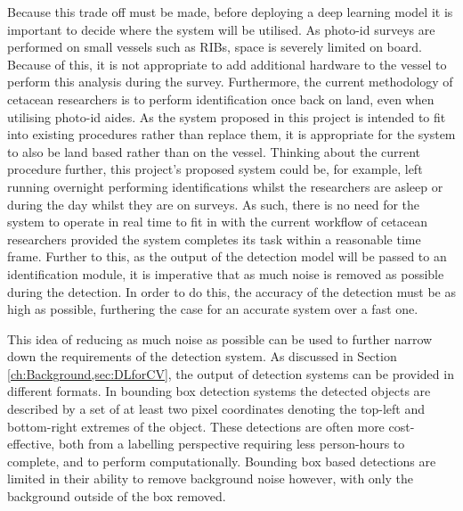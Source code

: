  Because this trade off must be made, before deploying a deep learning model it is important to decide where the system will be utilised. As photo-id surveys are performed on small vessels such as RIBs, space is severely limited on board. Because of this, it is not appropriate to add additional hardware to the vessel to perform this analysis during the survey. Furthermore, the current methodology of cetacean researchers is to perform identification once back on land, even when utilising photo-id aides. As the system proposed in this project is intended to fit into existing procedures rather than replace them, it is appropriate for the system to also be land based rather than on the vessel. Thinking about the current procedure further, this project's proposed system could be, for example, left running overnight performing identifications whilst the researchers are asleep or during the day whilst they are on surveys. As such, there is no need for the system to operate in real time to fit in with the current workflow of cetacean researchers provided the system completes its task within a reasonable time frame. Further to this, as the output of the detection model will be passed to an identification module, it is imperative that as much noise is removed as possible during the detection. In order to do this, the accuracy of the detection must be as high as possible, furthering the case for an accurate system over a fast one.
 
 This idea of reducing as much noise as possible can be used to further narrow down the requirements of the detection system. As discussed in Section \ref{ch:Background,sec:DLforCV}, the output of detection systems can be provided in different formats. In bounding box detection systems the detected objects are described by a set of at least two pixel coordinates denoting the top-left and bottom-right extremes of the object. These detections are often more cost-effective, both from a labelling perspective requiring less person-hours to complete, and to perform computationally. Bounding box based detections are limited in their ability to remove background noise however, with only the background outside of the box removed.
 
